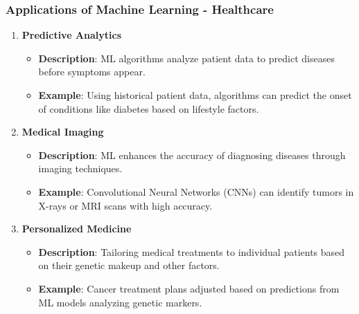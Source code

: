 \documentclass{beamer}
\begin{document}
\begin{frame}[fragile]
    \frametitle{Applications of Machine Learning - Healthcare}
    \begin{enumerate}
        \item \textbf{Predictive Analytics}
        \begin{itemize}
            \item \textbf{Description}: ML algorithms analyze patient data to predict diseases before symptoms appear.
            \item \textbf{Example}: Using historical patient data, algorithms can predict the onset of conditions like diabetes based on lifestyle factors.
        \end{itemize}
        
        \item \textbf{Medical Imaging}
        \begin{itemize}
            \item \textbf{Description}: ML enhances the accuracy of diagnosing diseases through imaging techniques.
            \item \textbf{Example}: Convolutional Neural Networks (CNNs) can identify tumors in X-rays or MRI scans with high accuracy.
        \end{itemize}
        
        \item \textbf{Personalized Medicine}
        \begin{itemize}
            \item \textbf{Description}: Tailoring medical treatments to individual patients based on their genetic makeup and other factors.
            \item \textbf{Example}: Cancer treatment plans adjusted based on predictions from ML models analyzing genetic markers.
        \end{itemize}
    \end{enumerate}
\end{frame}
\end{document}

